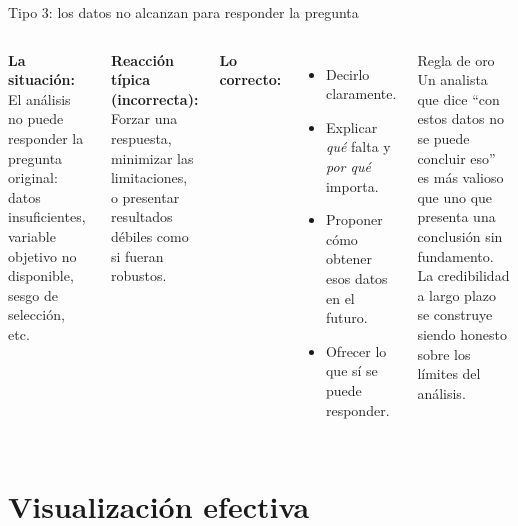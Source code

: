 \documentclass[aspectratio=169]{beamer}
\begin{document}
\begin{frame}{Tipo 3: los datos no alcanzan para responder la pregunta}
  \begin{columns}
      \textbf{La situación:}\\
      El análisis no puede responder la pregunta original: datos insuficientes, variable objetivo no disponible, sesgo de selección, etc.

      \bigskip
      \textbf{Reacción típica (incorrecta):}\\
      Forzar una respuesta, minimizar las limitaciones, o presentar resultados débiles como si fueran robustos.

      \bigskip
      \textbf{Lo correcto:}
      \begin{itemize}
        \item Decirlo claramente.
        \item Explicar \textit{qué} falta y \textit{por qué} importa.
        \item Proponer cómo obtener esos datos en el futuro.
        \item Ofrecer lo que sí se puede responder.
      \end{itemize}
      \begin{alertblock}{Regla de oro}
        Un analista que dice ``con estos datos no se puede concluir eso'' es más valioso que uno que presenta una conclusión sin fundamento.\\
        \bigskip
        La credibilidad a largo plazo se construye siendo honesto sobre los límites del análisis.
      \end{alertblock}
  \end{columns}
\end{frame}

\section{Visualización efectiva}
\end{document}
